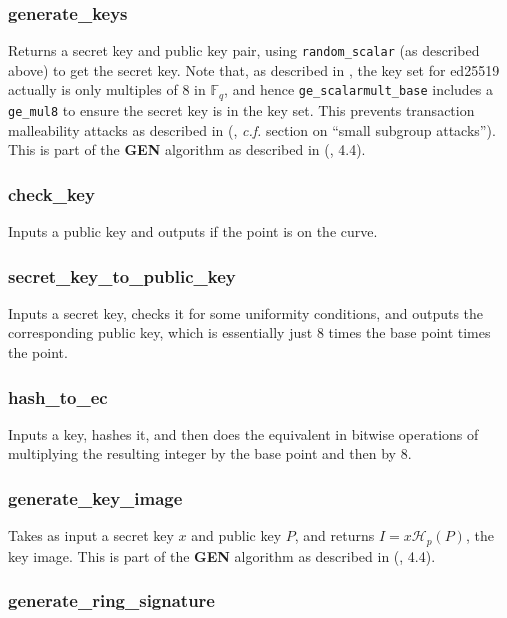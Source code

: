 \documentclass[12pt,english]{mrl}
\numberwithin{equation}{section}
\numberwithin{figure}{section}
\begin{document}
\subsubsection{\label{sub:generate_keys}generate\_keys}

Returns a secret key and public key pair, using \texttt{random\_scalar} (as
described above) to get the secret key. Note that, as described in
\cite{Bern}, the key set for ed25519 actually is only multiples of
$8$ in $\mathbb{F}_{q}$, and hence \texttt{ge\_scalarmult\_base} includes
a \texttt{ge\_mul8} to ensure the secret key is in the key set. This prevents 
transaction malleability attacks as described in (\cite{Bern},
{\it c.f.} section on ``small subgroup attacks''). This is part of the
\textbf{GEN} algorithm as described in (\cite{CN}, 4.4).


\subsubsection{check\_key}

Inputs a public key and outputs if the point is on the curve.


\subsubsection{secret\_key\_to\_public\_key}

Inputs a secret key, checks it for some uniformity conditions, and
outputs the corresponding public key, which is essentially just $8$
times the base point times the point. 


\subsubsection{hash\_to\_ec}

Inputs a key, hashes it, and then does the equivalent in bitwise operations
of multiplying the resulting integer by the base point and then by $8$. 


\subsubsection{generate\_key\_image}

Takes as input a secret key $x$ and public key $P$, and returns
$I=x\mathcal{H}_{p}\left(P\right)$, the key image. This is part of
the \textbf{GEN} algorithm as described in (\cite{CN}, 4.4).


\subsubsection{generate\_ring\_signature}
\end{document}
